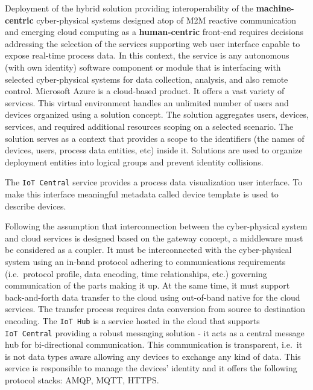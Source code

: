 \documentclass[
]{article}
\begin{document}
Deployment of the hybrid solution providing interoperability of the
\textbf{machine-centric} cyber-physical systems designed atop of M2M
reactive communication and emerging cloud computing as a
\textbf{human-centric} front-end requires decisions addressing the
selection of the services supporting web user interface capable to
expose real-time process data. In this context, the service is any
autonomous (with own identity) software component or module that is
interfacing with selected cyber-physical systems for data collection,
analysis, and also remote control. Microsoft Azure is a cloud-based
product. It offers a vast variety of services. This virtual environment
handles an unlimited number of users and devices organized using a
solution concept. The solution aggregates users, devices, services, and
required additional resources scoping on a selected scenario. The
solution serves as a context that provides a scope to the identifiers
(the names of devices, users, process data entities, etc) inside it.
Solutions are used to organize deployment entities into logical groups
and prevent identity collisions.

The \texttt{IoT\ Central} service provides a process data visualization
user interface. To make this interface meaningful metadata called device
template is used to describe devices.

Following the assumption that interconnection between the cyber-physical
system and cloud services is designed based on the gateway concept, a
middleware must be considered as a coupler. It must be interconnected
with the cyber-physical system using an in-band protocol adhering to
communications requirements (i.e.~protocol profile, data encoding, time
relationships, etc.) governing communication of the parts making it up.
At the same time, it must support back-and-forth data transfer to the
cloud using out-of-band native for the cloud services. The transfer
process requires data conversion from source to destination encoding.
The \texttt{IoT\ Hub} is a service hosted in the cloud that supports
\texttt{IoT\ Central} providing a robust messaging solution - it acts as
a central message hub for bi-directional communication. This
communication is transparent, i.e.~it is not data types aware allowing
any devices to exchange any kind of data. This service is responsible to
manage the devices' identity and it offers the following protocol
stacks: AMQP, MQTT, HTTPS.
\end{document}
